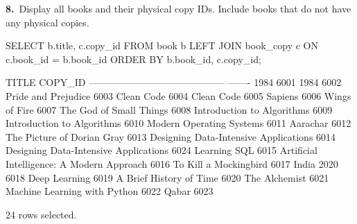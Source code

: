 \noindent\begin{minipage}{\linewidth}
\begingroup{}
{\fontsize{14}{17}\selectfont\textbf{8.}}\ Display all books and their physical copy IDs. Include books that do not have any physical copies.\par
\endgroup\vspace{12pt}


\begin{sqlcode}
SELECT b.title, c.copy_id
FROM book b
LEFT JOIN book_copy c ON c.book_id = b.book_id
ORDER BY b.book_id, c.copy_id;
\end{sqlcode}

\vspace{18pt}


\begin{sqlout}[fontsize=\small]
TITLE                                       COPY_ID
------------------------------------------  -------
1984                                           6001
1984                                           6002
Pride and Prejudice                            6003
Clean Code                                     6004
Clean Code                                     6005
Sapiens                                        6006
Wings of Fire                                  6007
The God of Small Things                        6008
Introduction to Algorithms                     6009
Introduction to Algorithms                     6010
Modern Operating Systems                       6011
Aarachar                                       6012
The Picture of Dorian Gray                     6013
Designing Data-Intensive Applications          6014
Designing Data-Intensive Applications          6024
Learning SQL                                   6015
Artificial Intelligence: A Modern Approach     6016
To Kill a Mockingbird                          6017
India 2020                                     6018
Deep Learning                                  6019
A Brief History of Time                        6020
The Alchemist                                  6021
Machine Learning with Python                   6022
Qabar                                          6023

24 rows selected.
\end{sqlout}
\end{minipage}\par\vspace{24pt}

